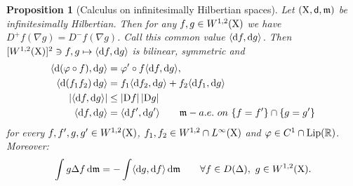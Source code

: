 \documentclass[11pt]{article}
\numberwithin{equation}{section}
\newtheorem{proposition}[theorem]{Proposition}
\newcommand{\R}{\mathbb{R}}
\newcommand{\X}{{\rm X}}
\newcommand{\sfd}{{\sf d}}
\newcommand{\mm}{{\mathfrak m}}
\renewcommand{\d}{{\rm d}}
\newcommand{\D}{{\rm D}}
\newcommand{\Lip}{{\rm Lip}}
\newcommand\la{\langle}
\newcommand\ra{\rangle}
\begin{document}
\begin{proposition}[Calculus on infinitesimally Hilbertian spaces]\label{prop:infhilbcalc} Let $(\X,\sfd,\mm)$ be infinitesimally Hilbertian. Then for any $f,g\in W^{1,2}(\X)$ we have $D^+f(\nabla g)=D^-f(\nabla g)$. Call this common value $\la\d f,\d g\ra$. Then $[W^{1,2}(\X)]^2\ni f,g\mapsto \la\d f,\d g\ra$ is bilinear, symmetric and 
\begin{subequations}
\begin{align}\label{eq:chainh}
\la\d(\varphi\circ f),\d g\ra&=\varphi'\circ f\la\d f,\d g\ra,\\%
\label{eq:leibh}
\la\d(f_1f_2)\,\d g\ra&=f_1\la\d f_2,\d g\ra+f_2\la\d f_1,\d g\ra\\%
\label{eq:csh}
|\la \d f,\d g\ra|&\leq|\D f|\,|\D g|\\%
\label{eq:loch}
\la \d f,\d g\ra&=\la \d f',\d g'\ra\qquad\mm-a.e.\ on\ \{f=f'\}\cap\{g=g'\}
\end{align}
\end{subequations}
for every $ f,f',g,g'\in W^{1,2}(\X)$, $f_1,f_2\in W^{1,2}\cap L^\infty(\X)$ and $ \varphi\in C^1\cap \Lip(\R)$. Moreover:
\begin{equation}
\label{eq:intlaph}
\int g\Delta f\,\d\mm=-\int\la\d g,\d f\ra\,\d\mm\qquad\forall f\in D(\Delta),\ g\in W^{1,2}(\X).
\end{equation}
\end{proposition}
\end{document}
